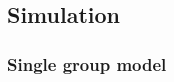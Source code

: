 \documentclass[12pt]{article}
\begin{document}
% 
% 

\subsection*{Simulation}
\subsubsection*{Single group model}
\end{document}
